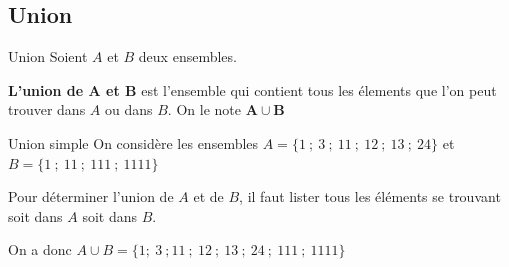 \documentclass[oneside,12pt]{article}          %
\begin{document}
%
%
%
%
%        	
%
%            
%


\subsection{Union}

\begin{definition}{Union}
	Soient $A$ et $B$ deux ensembles.

	\textbf{L'union de $\mathbold A$ et $\mathbold  B$} est l'ensemble qui contient tous les élements que l'on peut trouver dans $A$ ou dans $B$. On le note $\mathbold {A\cup B}$
\end{definition}


\begin{exemple}{Union simple}
	On considère les ensembles $A=\{1~;~3~;~11~;~12~;~13~;~24\}$ et $B=\{1~;~11~;~111~;~1111\}$

	Pour déterminer l'union de $A$ et de $B$, il faut lister tous les éléments se trouvant soit dans $A$ soit dans $B$.
	
	On a donc $A\cup B=\{1;~3~;11~;~12~;~13~;~24~;~111~;~1111\}$
\end{exemple}
\end{document}
